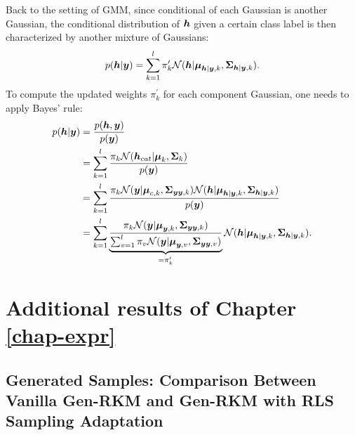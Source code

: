 Back to the setting of GMM, since conditional of each Gaussian is another Gaussian, the conditional distribution of $\boldsymbol{h}$ given a certain class label is then characterized by another mixture of Gaussians:
\begin{equation}
    p(\boldsymbol{h} | \boldsymbol{y}) = \sum_{k=1}^{l}\pi_k^{\prime}\mathcal{N}(\boldsymbol{h} | \boldsymbol{\mu}_{\boldsymbol{h}|\boldsymbol{y},k},\mathbf{\Sigma}_{\boldsymbol{h}|\boldsymbol{y},k}).
\end{equation}
To compute the updated weights $\pi_{k}^{\prime}$ for each component Gaussian, one needs to apply Bayes' rule:
\begin{equation}
    \begin{aligned}
        p(\boldsymbol{h} | \boldsymbol{y}) &= \frac{p(\boldsymbol{h},\boldsymbol{y})}{p(\boldsymbol{y})} \\
        &= \sum_{k=1}^{l}\frac{\pi_k \mathcal{N}(\boldsymbol{h}_{cat}|\boldsymbol{\mu}_k,\mathbf{\Sigma}_k)}{p(\boldsymbol{y})} \\
        &= \sum_{k=1}^{l} \frac{\pi_k\mathcal{N}(\boldsymbol{y}|\boldsymbol{\mu}_{c,k},\mathbf{\Sigma}_{\boldsymbol{y}\boldsymbol{y},k})\mathcal{N}(\boldsymbol{h} | \boldsymbol{\mu}_{\boldsymbol{h}|\boldsymbol{y},k},\mathbf{\Sigma}_{\boldsymbol{h}|\boldsymbol{y},k})}{p(\boldsymbol{y})} \\
        &= \sum_{k=1}^{l}  \underbrace{\frac{\pi_k \mathcal{N}(\boldsymbol{y}|\boldsymbol{\mu}_{\boldsymbol{y},k},\mathbf{\Sigma}_{\boldsymbol{y}\boldsymbol{y},k})}{\sum_{v=1}^{l}\pi_{v}\mathcal{N}(\boldsymbol{y} | \boldsymbol{\mu}_{\boldsymbol{y},v},\mathbf{\Sigma}_{\boldsymbol{y}\boldsymbol{y},v})}}_{=\pi_{k}^{\prime}}\mathcal{N}(\boldsymbol{h} | \boldsymbol{\mu}_{\boldsymbol{h}|\boldsymbol{y},k},\mathbf{\Sigma}_{\boldsymbol{h}|\boldsymbol{y},k}).
    \end{aligned}
\end{equation}

\chapter{Additional results of
Chapter \ref{chap-expr}}

\section{Generated Samples: Comparison Between Vanilla Gen-RKM and Gen-RKM with RLS Sampling Adaptation}

